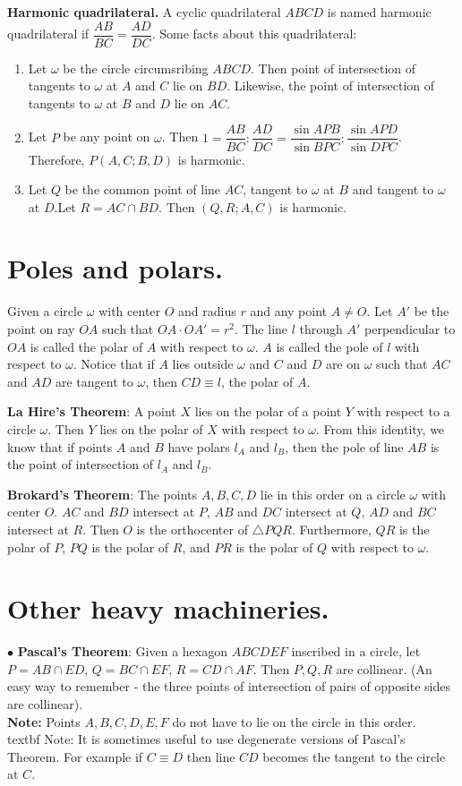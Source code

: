 \documentclass[11pt,a4paper]{article}
\begin{document}
\textbf {Harmonic quadrilateral.} A cyclic quadrilateral $ABCD$ is named harmonic quadrilateral if $\dfrac{AB}{BC}=\dfrac{AD}{DC}$. Some facts about this quadrilateral:
\begin {enumerate}
\item Let $\omega$ be the circle circumsribing $ABCD$. Then point of intersection of tangents to $\omega$ at $A$ and $C$ lie on $BD$. Likewise, the point of intersection of tangents to $\omega$ at $B$ and $D$ lie on $AC$.
\item Let $P$ be any point on $\omega$. Then $1=\dfrac{AB}{BC}:\dfrac{AD}{DC}=\dfrac{\sin APB}{\sin BPC}:\dfrac{\sin APD}{\sin DPC}$. Therefore, $P(A,C;B,D)$ is harmonic.
\item Let $Q$ be the common point of line $AC$, tangent to $\omega$ at $B$ and tangent to $\omega$ at $D$.Let $R=AC\cap BD.$ Then $(Q,R;A,C)$ is harmonic. 
\end {enumerate}

\section {Poles and polars.}
Given a circle $\omega$ with center $O$ and radius $r$ and any point $A\neq O$. Let $A'$ be the point on ray $OA$ such that $OA\cdot OA' = r^2.$ The line $l$ through $A'$ perpendicular to $OA$ is called the
polar of $A$ with respect to $\omega$. $A$ is called the pole of $l$ with respect to $\omega$. Notice that if $A$ lies outside $\omega$ and $C$ and $D$ are on $\omega$ such that $AC$ and $AD$ are tangent to $\omega$, then $CD\equiv l$, the polar of $A$.

\textbf {La Hire's Theorem}: A point $X$ lies on the polar of a point $Y$ with respect to a circle $\omega$. Then $Y$ lies on the polar of $X$ with respect to $\omega$. From this identity, we know that if points $A$ and $B$ have polars $l_A$ and $l_B$, then the pole of line $AB$ is the point of intersection of $l_A$ and $l_B$.

\textbf {Brokard's Theorem}: The points $A,B,C,D$ lie in this order on a circle $\omega$ with center $O$. $AC$ and $BD$ intersect at $P$, $AB$ and $DC$ intersect at $Q$, $AD$ and $BC$ intersect at $R$. Then $O$ is the orthocenter of $\triangle PQR$. Furthermore, $QR$ is the polar of $P$, $PQ$ is the polar of $R$, and $PR$ is the polar of $Q$ with respect to $\omega$.

\section {Other heavy machineries.}
$\bullet$ \textbf {Pascal's Theorem}: Given a hexagon $ABCDEF$ inscribed in a circle, let $P = AB\cap ED$, $Q=BC \cap EF$, $R = CD \cap AF$. Then $P, Q, R$ are collinear. (An easy way to remember - the three points of intersection of pairs of opposite sides are collinear).\\
\textbf {Note:} Points $A,B,C,D,E, F$ do not have to lie on the circle in this order.\\
textbf {Note:} It is sometimes useful to use degenerate versions of Pascal's Theorem. For example if $C\equiv D$ then line $CD$ becomes the tangent to the circle at $C$.
\end{document}
